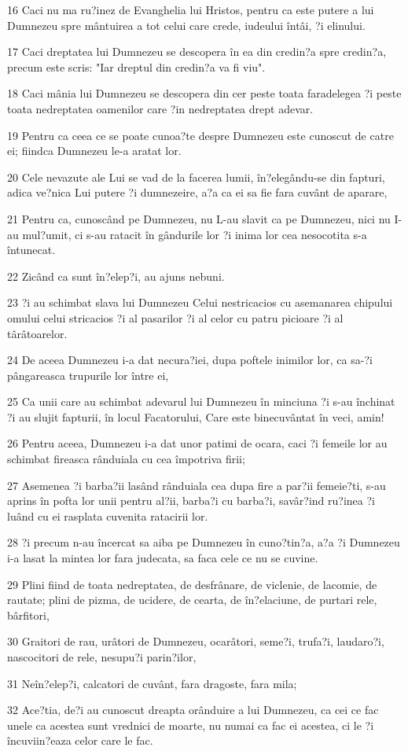 \par 16 Caci nu ma ru?inez de Evanghelia lui Hristos, pentru ca este putere a lui Dumnezeu spre mântuirea a tot celui care crede, iudeului întâi, ?i elinului.
\par 17 Caci dreptatea lui Dumnezeu se descopera în ea din credin?a spre credin?a, precum este scris: "Iar dreptul din credin?a va fi viu".
\par 18 Caci mânia lui Dumnezeu se descopera din cer peste toata faradelegea ?i peste toata nedreptatea oamenilor care ?in nedreptatea drept adevar.
\par 19 Pentru ca ceea ce se poate cunoa?te despre Dumnezeu este cunoscut de catre ei; fiindca Dumnezeu le-a aratat lor.
\par 20 Cele nevazute ale Lui se vad de la facerea lumii, în?elegându-se din fapturi, adica ve?nica Lui putere ?i dumnezeire, a?a ca ei sa fie fara cuvânt de aparare,
\par 21 Pentru ca, cunoscând pe Dumnezeu, nu L-au slavit ca pe Dumnezeu, nici nu I-au mul?umit, ci s-au ratacit în gândurile lor ?i inima lor cea nesocotita s-a întunecat.
\par 22 Zicând ca sunt în?elep?i, au ajuns nebuni.
\par 23 ?i au schimbat slava lui Dumnezeu Celui nestricacios cu asemanarea chipului omului celui stricacios ?i al pasarilor ?i al celor cu patru picioare ?i al târâtoarelor.
\par 24 De aceea Dumnezeu i-a dat necura?iei, dupa poftele inimilor lor, ca sa-?i pângareasca trupurile lor între ei,
\par 25 Ca unii care au schimbat adevarul lui Dumnezeu în minciuna ?i s-au închinat ?i au slujit fapturii, în locul Facatorului, Care este binecuvântat în veci, amin!
\par 26 Pentru aceea, Dumnezeu i-a dat unor patimi de ocara, caci ?i femeile lor au schimbat fireasca rânduiala cu cea împotriva firii;
\par 27 Asemenea ?i barba?ii lasând rânduiala cea dupa fire a par?ii femeie?ti, s-au aprins în pofta lor unii pentru al?ii, barba?i cu barba?i, savâr?ind ru?inea ?i luând cu ei rasplata cuvenita ratacirii lor.
\par 28 ?i precum n-au încercat sa aiba pe Dumnezeu în cuno?tin?a, a?a ?i Dumnezeu i-a lasat la mintea lor fara judecata, sa faca cele ce nu se cuvine.
\par 29 Plini fiind de toata nedreptatea, de desfrânare, de viclenie, de lacomie, de rautate; plini de pizma, de ucidere, de cearta, de în?elaciune, de purtari rele, bârfitori,
\par 30 Graitori de rau, urâtori de Dumnezeu, ocarâtori, seme?i, trufa?i, laudaro?i, nascocitori de rele, nesupu?i parin?ilor,
\par 31 Neîn?elep?i, calcatori de cuvânt, fara dragoste, fara mila;
\par 32 Ace?tia, de?i au cunoscut dreapta orânduire a lui Dumnezeu, ca cei ce fac unele ca acestea sunt vrednici de moarte, nu numai ca fac ei acestea, ci le ?i încuviin?eaza celor care le fac.

